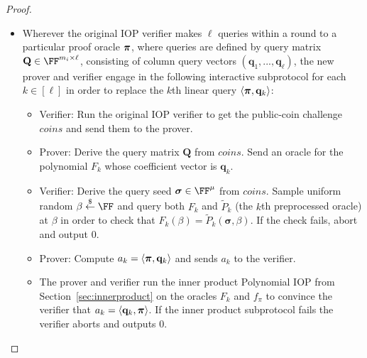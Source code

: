 \begin{proof}
\begin{itemize}
\item Wherever the original IOP verifier makes $\ell$ queries within a round to a particular proof oracle $\boldsymbol{\pi}$, where queries are defined by query matrix $\mathbf{Q} \in \FF^{m_i \times \ell}$, consisting of column query vectors $(\mathbf{q}_1,...,\mathbf{q}_\ell)$, the new prover and verifier engage in the following interactive subprotocol for each $k \in [\ell]$ in order to replace the $k$th linear query $\langle \boldsymbol{\pi}, \mathbf{q}_k \rangle$: 

\begin{itemize}
\item Verifier: Run the original IOP verifier to get the public-coin challenge $\mathit{coins}$ and send them to the prover.
 \item Prover: Derive the query matrix $\mathbf{Q}$ from $\mathit{coins}$. Send an oracle for the polynomial $F_k$ whose coefficient vector is $\mathbf{q}_k$. 
 \item Verifier: Derive the query seed $\boldsymbol{\sigma} \in \FF^\mu$ from $\mathit{coins}$. Sample uniform random $\beta \sample \FF$ and query both $F_k$ and $\tilde{P}_k$ (the $k$th preprocessed oracle) at $\beta$ in order to check that $F_k (\beta) = \tilde{P}_k(\boldsymbol{\sigma}, \beta)$. If the check fails, abort and output 0.
 
 
 \item Prover: Compute $a_k = \langle \boldsymbol{\pi}, \mathbf{q}_k \rangle$ and sends $a_k$ to the verifier. 
 
 \item The prover and verifier run the inner product Polynomial IOP from Section~\ref{sec:innerproduct} on the oracles $F_k$ and $f_\pi$ to convince the verifier that $a_k = \langle \mathbf{q}_k, \boldsymbol{\pi} \rangle$. If the inner product subprotocol fails the verifier aborts and outputs 0.  
 \end{itemize}
 

\end{itemize}
\end{proof}
